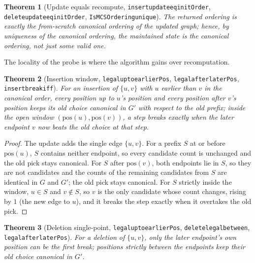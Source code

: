 \documentclass[11pt]{article}
\newtheorem{theorem}{Theorem}
\theoremstyle{definition}
\theoremstyle{remark}
\newcommand{\leanname}[1]{%
  \texttt{\begingroup\def\_{\textunderscore\allowbreak}#1\endgroup}}
\begin{document}
\begin{theorem}[Update equals recompute, \leanname{insert\_update\_eq\_initOrder}, \leanname{delete\_update\_eq\_initOrder}, \leanname{IsMCSOrdering\_unique}]
The returned ordering is exactly the from-scratch canonical ordering of the
updated graph; hence, by uniqueness of the canonical ordering, the maintained
state is the canonical ordering, not just some valid one.
\end{theorem}

The locality of the probe is where the algorithm gains over recomputation.

\begin{theorem}[Insertion window, \leanname{legal\_upto\_earlierPos}, \leanname{legal\_after\_laterPos}, \leanname{insert\_break\_iff}]
\label{thm:insert-window}
For an insertion of $\{u,v\}$ with $u$ earlier than $v$ in the canonical order,
every position up to $u$'s position and every position after $v$'s position keeps
its old choice canonical in $G'$ with respect to the old prefix; inside the open window
$(\mathrm{pos}(u),\mathrm{pos}(v))$, a step breaks exactly when the later
endpoint $v$ now beats the old choice at that step.
\end{theorem}

\begin{proof}
The update adds the single edge $\{u,v\}$. For a prefix $S$ at or before
$\mathrm{pos}(u)$, $S$ contains neither endpoint, so every candidate count is
unchanged and the old pick stays canonical. For $S$ after $\mathrm{pos}(v)$, both
endpoints lie in $S$, so they are not candidates and the counts of the remaining
candidates from $S$ are identical in $G$ and $G'$; the old pick stays canonical.
For $S$ strictly inside the window, $u\in S$ and $v\notin S$, so $v$ is the only
candidate whose count changes, rising by $1$ (the new edge to $u$), and it
breaks the step exactly when it overtakes the old pick.
\end{proof}

\begin{theorem}[Deletion single-point, \leanname{legal\_upto\_earlierPos}, \leanname{delete\_legal\_between}, \leanname{legal\_after\_laterPos}]
\label{thm:delete-point}
For a deletion of $\{u,v\}$, only the later endpoint's own position can be the
first break; positions strictly between the endpoints keep their old choice
canonical in $G'$.
\end{theorem}
\end{document}
